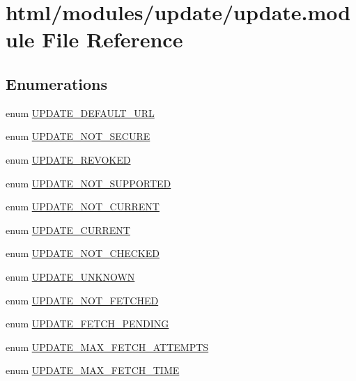\hypertarget{update_8module}{
\section{html/modules/update/update.module File Reference}
\label{update_8module}
}
\subsection*{Enumerations}
\begin{DoxyCompactItemize}
\item 
enum \hyperlink{update_8module_aebab39aae38da226a778ab47bf74ae65}{UPDATE\_\-DEFAULT\_\-URL} 
\item 
enum \hyperlink{update_8module_ac41501f4ca3307cc81bbabbcf6139b61}{UPDATE\_\-NOT\_\-SECURE} 
\item 
enum \hyperlink{update_8module_ae81bb81453c1ad2b97544aa1ccbe1b0c}{UPDATE\_\-REVOKED} 
\item 
enum \hyperlink{update_8module_a553f353b4e62f532ea5cb95a827421ac}{UPDATE\_\-NOT\_\-SUPPORTED} 
\item 
enum \hyperlink{update_8module_a1cf8c4b62d552b0c62ae317040760744}{UPDATE\_\-NOT\_\-CURRENT} 
\item 
enum \hyperlink{update_8module_a2286dc81621d0ea6c92e731930dc7492}{UPDATE\_\-CURRENT} 
\item 
enum \hyperlink{update_8module_a322f30231755ebbc7b4a8be77e574a43}{UPDATE\_\-NOT\_\-CHECKED} 
\item 
enum \hyperlink{update_8module_a00865274cb5f17217b9a4f137fe33609}{UPDATE\_\-UNKNOWN} 
\item 
enum \hyperlink{update_8module_a2cc9d3de7448a0dc6fe7a74e76fda1ac}{UPDATE\_\-NOT\_\-FETCHED} 
\item 
enum \hyperlink{update_8module_ab6032ea4bca533dbb7ff44187401349b}{UPDATE\_\-FETCH\_\-PENDING} 
\item 
enum \hyperlink{update_8module_af6288154fbed0f550434f71cf3e547d8}{UPDATE\_\-MAX\_\-FETCH\_\-ATTEMPTS} 
\item 
enum \hyperlink{update_8module_a9975bc9775cebdd7922532339997220a}{UPDATE\_\-MAX\_\-FETCH\_\-TIME} 
\end{DoxyCompactItemize}
